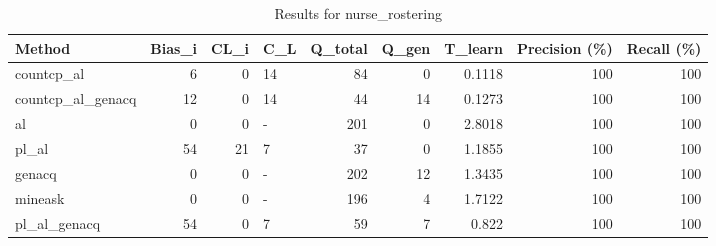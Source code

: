 \begin{table}[ht]
\caption{Results for nurse_rostering}
\begin{tabular}{lrrlrrrrr}
\hline
 Method            &   Bias\_i &   CL\_i & C\_L   &   Q\_total &   Q\_gen &   T\_learn &   Precision (\%) &   Recall (\%) \\
\hline
 countcp\_al        &        6 &      0 & 14    &        84 &       0 &    0.1118 &             100 &          100 \\
 countcp\_al\_genacq &       12 &      0 & 14    &        44 &      14 &    0.1273 &             100 &          100 \\
 al                &        0 &      0 & -     &       201 &       0 &    2.8018 &             100 &          100 \\
 pl\_al             &       54 &     21 & 7     &        37 &       0 &    1.1855 &             100 &          100 \\
 genacq            &        0 &      0 & -     &       202 &      12 &    1.3435 &             100 &          100 \\
 mineask           &        0 &      0 & -     &       196 &       4 &    1.7122 &             100 &          100 \\
 pl\_al\_genacq      &       54 &      0 & 7     &        59 &       7 &    0.822  &             100 &          100 \\
\hline
\end{tabular}
\end{table}